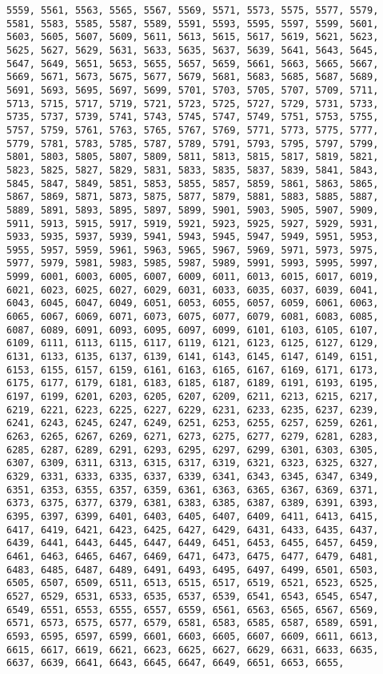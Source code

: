 \documentclass[11pt]{article}
\begin{document}
\begin{Verbatim}[commandchars=\\\{\}]
5559, 5561, 5563, 5565, 5567, 5569, 5571, 5573, 5575, 5577, 5579, 5581, 5583, 5585, 5587, 5589, 5591, 5593, 5595, 5597, 5599, 5601, 5603, 5605, 5607, 5609, 5611, 5613, 5615, 5617, 5619, 5621, 5623, 5625, 5627, 5629, 5631, 5633, 5635, 5637, 5639, 5641, 5643, 5645, 5647, 5649, 5651, 5653, 5655, 5657, 5659, 5661, 5663, 5665, 5667, 5669, 5671, 5673, 5675, 5677, 5679, 5681, 5683, 5685, 5687, 5689, 5691, 5693, 5695, 5697, 5699, 5701, 5703, 5705, 5707, 5709, 5711, 5713, 5715, 5717, 5719, 5721, 5723, 5725, 5727, 5729, 5731, 5733, 5735, 5737, 5739, 5741, 5743, 5745, 5747, 5749, 5751, 5753, 5755, 5757, 5759, 5761, 5763, 5765, 5767, 5769, 5771, 5773, 5775, 5777, 5779, 5781, 5783, 5785, 5787, 5789, 5791, 5793, 5795, 5797, 5799, 5801, 5803, 5805, 5807, 5809, 5811, 5813, 5815, 5817, 5819, 5821, 5823, 5825, 5827, 5829, 5831, 5833, 5835, 5837, 5839, 5841, 5843, 5845, 5847, 5849, 5851, 5853, 5855, 5857, 5859, 5861, 5863, 5865, 5867, 5869, 5871, 5873, 5875, 5877, 5879, 5881, 5883, 5885, 5887, 5889, 5891, 5893, 5895, 5897, 5899, 5901, 5903, 5905, 5907, 5909, 5911, 5913, 5915, 5917, 5919, 5921, 5923, 5925, 5927, 5929, 5931, 5933, 5935, 5937, 5939, 5941, 5943, 5945, 5947, 5949, 5951, 5953, 5955, 5957, 5959, 5961, 5963, 5965, 5967, 5969, 5971, 5973, 5975, 5977, 5979, 5981, 5983, 5985, 5987, 5989, 5991, 5993, 5995, 5997, 5999, 6001, 6003, 6005, 6007, 6009, 6011, 6013, 6015, 6017, 6019, 6021, 6023, 6025, 6027, 6029, 6031, 6033, 6035, 6037, 6039, 6041, 6043, 6045, 6047, 6049, 6051, 6053, 6055, 6057, 6059, 6061, 6063, 6065, 6067, 6069, 6071, 6073, 6075, 6077, 6079, 6081, 6083, 6085, 6087, 6089, 6091, 6093, 6095, 6097, 6099, 6101, 6103, 6105, 6107, 6109, 6111, 6113, 6115, 6117, 6119, 6121, 6123, 6125, 6127, 6129, 6131, 6133, 6135, 6137, 6139, 6141, 6143, 6145, 6147, 6149, 6151, 6153, 6155, 6157, 6159, 6161, 6163, 6165, 6167, 6169, 6171, 6173, 6175, 6177, 6179, 6181, 6183, 6185, 6187, 6189, 6191, 6193, 6195, 6197, 6199, 6201, 6203, 6205, 6207, 6209, 6211, 6213, 6215, 6217, 6219, 6221, 6223, 6225, 6227, 6229, 6231, 6233, 6235, 6237, 6239, 6241, 6243, 6245, 6247, 6249, 6251, 6253, 6255, 6257, 6259, 6261, 6263, 6265, 6267, 6269, 6271, 6273, 6275, 6277, 6279, 6281, 6283, 6285, 6287, 6289, 6291, 6293, 6295, 6297, 6299, 6301, 6303, 6305, 6307, 6309, 6311, 6313, 6315, 6317, 6319, 6321, 6323, 6325, 6327, 6329, 6331, 6333, 6335, 6337, 6339, 6341, 6343, 6345, 6347, 6349, 6351, 6353, 6355, 6357, 6359, 6361, 6363, 6365, 6367, 6369, 6371, 6373, 6375, 6377, 6379, 6381, 6383, 6385, 6387, 6389, 6391, 6393, 6395, 6397, 6399, 6401, 6403, 6405, 6407, 6409, 6411, 6413, 6415, 6417, 6419, 6421, 6423, 6425, 6427, 6429, 6431, 6433, 6435, 6437, 6439, 6441, 6443, 6445, 6447, 6449, 6451, 6453, 6455, 6457, 6459, 6461, 6463, 6465, 6467, 6469, 6471, 6473, 6475, 6477, 6479, 6481, 6483, 6485, 6487, 6489, 6491, 6493, 6495, 6497, 6499, 6501, 6503, 6505, 6507, 6509, 6511, 6513, 6515, 6517, 6519, 6521, 6523, 6525, 6527, 6529, 6531, 6533, 6535, 6537, 6539, 6541, 6543, 6545, 6547, 6549, 6551, 6553, 6555, 6557, 6559, 6561, 6563, 6565, 6567, 6569, 6571, 6573, 6575, 6577, 6579, 6581, 6583, 6585, 6587, 6589, 6591, 6593, 6595, 6597, 6599, 6601, 6603, 6605, 6607, 6609, 6611, 6613, 6615, 6617, 6619, 6621, 6623, 6625, 6627, 6629, 6631, 6633, 6635, 6637, 6639, 6641, 6643, 6645, 6647, 6649, 6651, 6653, 6655, 
\end{Verbatim}
\end{document}
